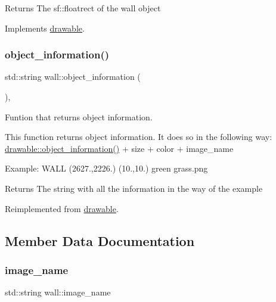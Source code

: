 \begin{DoxyReturn}{Returns}
The sf\+::floatrect of the wall object 
\end{DoxyReturn}


Implements \hyperlink{classdrawable_ae013ac0be47538be9ce885d6642daf73}{drawable}.

\mbox{\label{classwall_aab1de4f144f176b134a967ba08747932}} 
\subsubsection{\texorpdfstring{object\+\_\+information()}{object\_information()}}
{\footnotesize\ttfamily std\+::string wall\+::object\+\_\+information (\begin{DoxyParamCaption}{ }\end{DoxyParamCaption})\hspace{0.3cm}{\ttfamily [override]}, {\ttfamily [virtual]}}



Funtion that returns object information. 

This function returns object information. It does so in the following way\+: \hyperlink{classdrawable_a2ed0f8bb53f33477f7722efa7bb24583}{drawable\+::object\+\_\+information()} + size + color + image\+\_\+name

Example\+: W\+A\+LL (2627.,2226.) (10.,10.) green grass.\+png

\begin{DoxyReturn}{Returns}
The string with all the information in the way of the example 
\end{DoxyReturn}


Reimplemented from \hyperlink{classdrawable_a2ed0f8bb53f33477f7722efa7bb24583}{drawable}.



\subsection{Member Data Documentation}
\mbox{\label{classwall_acab3382f9e7092cf8bb62a5f88586d92}} 
\subsubsection{\texorpdfstring{image\+\_\+name}{image\_name}}
{\footnotesize\ttfamily std\+::string wall\+::image\+\_\+name\hspace{0.3cm}{\ttfamily [private]}}

